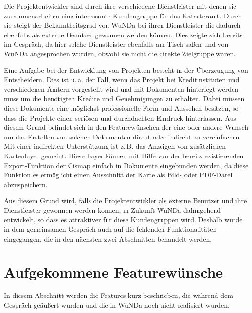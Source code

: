 Die Projektentwickler sind durch ihre verschiedene Dienstleister mit denen sie zusammenarbeiten eine interessante Kundengruppe für das Katasteramt.
Durch sie steigt der Bekanntheitsgrad von \ac{WuNDa} bei ihren Dienstleister die dadurch ebenfalls als externe Benutzer gewonnen werden können.
Dies zeigte sich bereits im Gespräch, da hier solche Dienstleister ebenfalls am Tisch saßen und von \ac{WuNDa} angesprochen wurden, obwohl sie nicht die direkte Zielgruppe waren.


Eine Aufgabe bei der Entwicklung von Projekten besteht in der Überzeugung von Entscheidern.
Dies ist u.\,a. der Fall, wenn das Projekt bei Kreditinstituten und verschiedenen Ämtern vorgestellt wird und mit Dokumenten hinterlegt werden muss um die benötigten Kredite und Genehmigungen zu erhalten.
Dabei müssen diese Dokumente eine möglichst professionelle Form und Aussehen besitzen, so dass die Projekte einen seriösen und durchdachten Eindruck hinterlassen.
Aus diesem Grund befindet sich in den Featurewünschen der eine oder andere Wunsch um das Erstellen von solchen Dokumenten direkt oder indirekt zu vereinfachen.
Mit einer indirekten Unterstützung ist z.\,B. das Anzeigen von zusätzlichen Kartenlayer gemeint.
Diese Layer können mit Hilfe von der bereits existierenden Export-Funktion der Cismap  einfach in Dokumente eingebunden werden, da diese Funktion es ermöglicht einen Ausschnitt der Karte als Bild- oder PDF-Datei abzuspeichern. 

Aus diesem Grund wird, falls die Projektentwickler als externe Benutzer und ihre Dienstleister gewonnen werden können, in Zukunft \ac{WuNDa} dahingehend entwickelt, so dass es attraktiver für diese Kundengruppen wird.
Deshalb wurde in dem gemeinsamen Gespräch auch auf die fehlenden Funktionalitäten eingegangen, die in den nächsten zwei Abschnitten behandelt werden.

\section{Aufgekommene Featurewünsche}
In diesem Abschnitt werden die Features kurz beschrieben, die während dem Gespräch geäußert wurden und die in \ac{WuNDa} noch nicht realisiert wurden.

